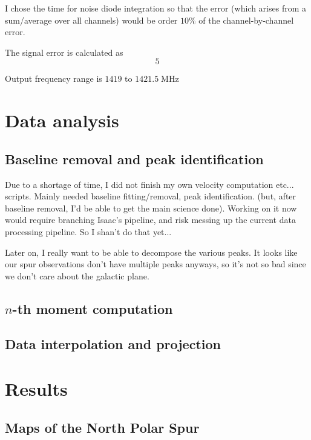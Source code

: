 \documentclass[10pt]{article}
\newcommand {\mt}{\mathrm}
\newcommand {\unit}[1]{\; \mt{#1}}
\begin{document}
I chose the time for noise diode integration so that the error (which arises from a sum/average over all channels) would be order $10\%$ of the channel-by-channel error.

The signal error is calculated as
\[
    5
\]

Output frequency range is $1419$ to $1421.5\unit{MHz}$

\section{Data analysis}

\subsection{Baseline removal and peak identification}

Due to a shortage of time, I did not finish my own
velocity computation etc... scripts.  Mainly needed baseline fitting/removal, peak identification.  (but, after baseline removal, I'd be able to get the main science done).  Working on it now would require branching Isaac's pipeline, and risk messing up the current data processing pipeline.  So I shan't do that yet...

Later on, I really want to be able to decompose the various peaks.  It
looks like our spur observations don't have multiple peaks anyways, so it's not
so bad since we don't care about the galactic plane.

\subsection{$n$-th moment computation}

\subsection{Data interpolation and projection}



\section{Results}

\subsection{Maps of the North Polar Spur}
\end{document}
